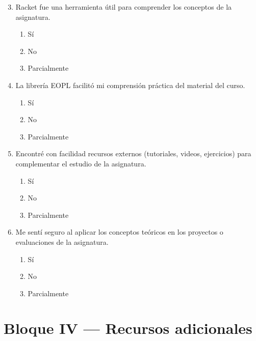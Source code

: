 \begin{enumerate}
    \setcounter{enumi}{2}

    \item Racket fue una herramienta útil para comprender los conceptos de la asignatura.
    \begin{enumerate}
        \item Sí
        \item No
        \item Parcialmente
    \end{enumerate}

    \item La librería EOPL facilitó mi comprensión práctica del material del curso.
    \begin{enumerate}
        \item Sí
        \item No
        \item Parcialmente
    \end{enumerate}

    \item Encontré con facilidad recursos externos (tutoriales, videos, ejercicios) para complementar el estudio de la asignatura.
    \begin{enumerate}
        \item Sí
        \item No
        \item Parcialmente
    \end{enumerate}

    \item Me sentí seguro al aplicar los conceptos teóricos en los proyectos o evaluaciones de la asignatura.
    \begin{enumerate}
        \item Sí
        \item No
        \item Parcialmente
    \end{enumerate}
\end{enumerate}

\section*{Bloque IV — Recursos adicionales}


